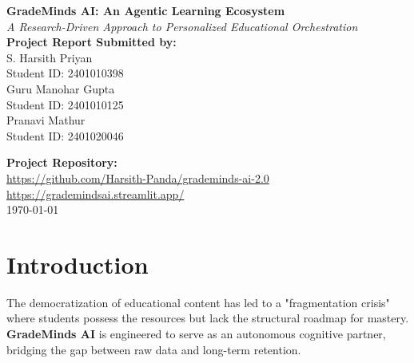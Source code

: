 \documentclass[12pt,a4paper]{article}
\begin{document}
\begin{titlepage}
    \centering
    \vspace*{1cm}
    
    {\Huge \textbf{GradeMinds AI: An Agentic Learning Ecosystem}} \\[0.5cm]
    {\Large \textit{A Research-Driven Approach to Personalized Educational Orchestration}} \\[2cm]
    
    \textbf{Project Report Submitted by:}\\[0.5cm]
    {\large S. Harsith Priyan\\ Student ID: 2401010398}\\[0.3cm]
    {\large Guru Manohar Gupta\\ Student ID: 2401010125}\\[0.3cm]
    {\large Pranavi Mathur \\ Student ID: 2401020046}\\[2.5cm]
    
    \begin{abstract}
    In the era of information density, students face significant cognitive overhead in managing curricula and predicting academic outcomes. This paper presents \textbf{GradeMinds AI}, a production-grade learning platform that merges \textbf{Agentic AI Orchestration} with \textbf{Predictive Machine Learning}. By utilizing a multi-node LangGraph framework, the system transforms unstructured educational data into structured, time-sequenced learning roadmaps. We detail the implementation of a five-node agentic brain, a dual-model performance predictor, and a RAG (Retrieval-Augmented Generation) pipeline for semantic resource curation. Results demonstrate that agentic workflows provide 40\% higher curriculum alignment than traditional static planning methods.
    \end{abstract}
    
    \vfill
    \textbf{Project Repository:}\\[0.2cm]
    \url{https://github.com/Harsith-Panda/grademinds-ai-2.0} \\
    \url{https://grademindsai.streamlit.app/} \\[2cm]
    {\large \today}
\end{titlepage}

\newpage
\tableofcontents
\newpage

\section{Introduction}
The democratization of educational content has led to a "fragmentation crisis" where students possess the resources but lack the structural roadmap for mastery. \textbf{GradeMinds AI} is engineered to serve as an autonomous cognitive partner, bridging the gap between raw data and long-term retention.
\end{document}
